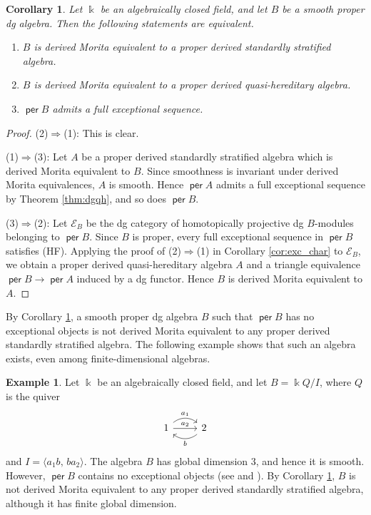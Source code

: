 \documentclass[a4paper,reqno,11pt]{amsart}
\numberwithin{equation}{section}
\newtheorem{corollary}[theorem]{Corollary}
\theoremstyle{definition}
\newtheorem{example}[theorem]{Example}
\newcommand{\E}{\mathcal{E}}
\newcommand{\kk}{\Bbbk}
\DeclareMathOperator{\per}{\mathsf{per}}
\begin{document}
\begin{corollary}\label{cor:smooth_exc}
Let $\kk$ be an algebraically closed field, and let $B$ be a smooth proper dg algebra.
Then the following statements are equivalent.
\begin{enumerate}
\item $B$ is derived Morita equivalent to a proper derived standardly stratified algebra.
\item $B$ is derived Morita equivalent to a proper derived quasi-hereditary algebra.
\item $\per B$ admits a full exceptional sequence.
\end{enumerate}
\end{corollary}
\begin{proof}
(2)$\Rightarrow$(1): This is clear.

(1)$\Rightarrow$(3): Let $A$ be a proper derived standardly stratified algebra which is derived Morita equivalent to $B$.
Since smoothness is invariant under derived Morita equivalences, $A$ is smooth.
Hence $\per A$ admits a full exceptional sequence by Theorem \ref{thm:dgqh}, and so does $\per B$.

(3)$\Rightarrow$(2): Let $\E_{B}$ be the dg category of homotopically projective dg $B$-modules belonging to $\per B$.
Since $B$ is proper, every full exceptional sequence in $\per B$ satisfies (HF).
Applying the proof of (2)$\Rightarrow$(1) in Corollary \ref{cor:exc_char} to $\E_{B}$, we obtain a proper derived quasi-hereditary algebra $A$ and a triangle equivalence $\per B\to\per A$ induced by a dg functor.
Hence $B$ is derived Morita equivalent to $A$.
\end{proof}

By Corollary \ref{cor:smooth_exc}, a smooth proper dg algebra $B$ such that $\per B$ has no exceptional objects is not derived Morita equivalent to any proper derived standardly stratified algebra.
The following example shows that such an algebra exists, even among finite-dimensional algebras.

\begin{example}\label{ex:happel}
Let $\kk$ be an algebraically closed field, and let $B=\kk Q/I$, where $Q$ is the quiver
\[
\begin{tikzcd}
1 \arrow[r, bend left=40, "a_{1}"] \arrow[r, "a_{2}"] & 2 \arrow[l, bend left=40, "b"]
\end{tikzcd}
\]
and $I=\langle a_{1}b,\,ba_{2}\rangle$.
The algebra $B$ has global dimension $3$, and hence it is smooth.
However, $\per B$ contains no exceptional objects (see \cite[Section 3]{H91} and \cite[Example 4.10]{RS22}).
By Corollary \ref{cor:smooth_exc}, $B$ is not derived Morita equivalent to any proper derived standardly stratified algebra, although it has finite global dimension.
\end{example}
\end{document}
